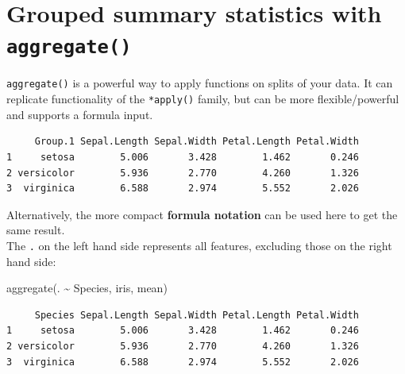 \documentclass[
]{book}
\newenvironment{Shaded}{\begin{snugshade}}{\end{snugshade}}
\newcommand{\AttributeTok}[1]{\textcolor[rgb]{0.77,0.63,0.00}{#1}}
\newcommand{\DecValTok}[1]{\textcolor[rgb]{0.00,0.00,0.81}{#1}}
\newcommand{\FunctionTok}[1]{\textcolor[rgb]{0.00,0.00,0.00}{#1}}
\newcommand{\NormalTok}[1]{#1}
\newcommand{\SpecialCharTok}[1]{\textcolor[rgb]{0.00,0.00,0.00}{#1}}
\begin{document}
\hypertarget{grouped-summary-statistics-with-aggregate}{%
\section{\texorpdfstring{Grouped summary statistics with \texttt{aggregate()}}{Grouped summary statistics with aggregate()}}\label{grouped-summary-statistics-with-aggregate}}

\texttt{aggregate()} is a powerful way to apply functions on splits of your data. It can replicate functionality of the \texttt{*apply()} family, but can be more flexible/powerful and supports a formula input.

\begin{Shaded}
\end{Shaded}

\begin{verbatim}
     Group.1 Sepal.Length Sepal.Width Petal.Length Petal.Width
1     setosa        5.006       3.428        1.462       0.246
2 versicolor        5.936       2.770        4.260       1.326
3  virginica        6.588       2.974        5.552       2.026
\end{verbatim}

Alternatively, the more compact \textbf{formula notation} can be used here to get the same result.\\
The \texttt{.} on the left hand side represents all features, excluding those on the right hand side:

\begin{Shaded}
\begin{Highlighting}[]
\FunctionTok{aggregate}\NormalTok{(. }\SpecialCharTok{\textasciitilde{}}\NormalTok{ Species, iris, mean)}
\end{Highlighting}
\end{Shaded}

\begin{verbatim}
     Species Sepal.Length Sepal.Width Petal.Length Petal.Width
1     setosa        5.006       3.428        1.462       0.246
2 versicolor        5.936       2.770        4.260       1.326
3  virginica        6.588       2.974        5.552       2.026
\end{verbatim}
\end{document}
